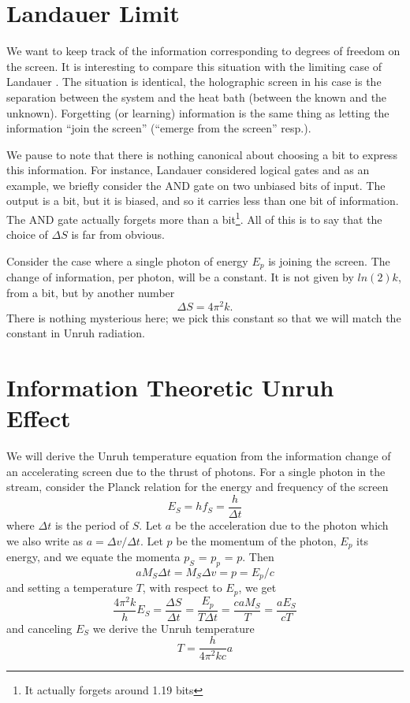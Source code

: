 \documentclass[12pt,a4paper]{article}
\begin{document}
\section{Landauer Limit}
We want to keep track of the information corresponding to degrees of freedom on the screen. It is interesting to compare this situation with the limiting case of Landauer \cite{landauer}.  The situation is identical, the holographic screen in his case is the separation between the system and the heat bath (between the known and the unknown).  Forgetting (or learning) information is the same thing as letting the information ``join the screen'' (``emerge from the screen'' resp.).

We pause to note that there is nothing canonical about choosing a bit to express this information.  For instance, Landauer considered logical gates and as an example, we briefly consider the AND gate on two unbiased bits of input.  The output is a bit, but it is biased, and so it carries less than one bit of information.  The AND gate actually forgets more than a bit\footnote{It actually forgets around 1.19 bits}.  All of this is to say that the choice of $\Delta S$ is far from obvious.

Consider the case where a single photon of energy $E_p$ is joining the screen.  The change of information, per photon, will be a constant.  It is not given by $ln(2)k$, from a bit, but by another number
\[
  \Delta S = 4 \pi ^ 2 k.
\]
There is nothing mysterious here; we pick this constant so that we will match the constant in Unruh radiation.

\section{Information Theoretic Unruh Effect}

We will derive the Unruh temperature equation from the information change of an accelerating screen due to the thrust of photons. For a single photon in the stream, consider the Planck relation for the energy and frequency of the screen
\[
  E_S = h f_S = \frac{h}{\Delta t}
\]
where $\Delta t$ is the period of $S$. Let $a$ be the acceleration due to the photon which we also write as $a = \Delta v / \Delta t$.  Let $p$ be the momentum of the photon, $E_p$ its energy, and we equate the momenta $p_S$ = $p_p$ = $p$.  Then
\[
  a M_S \Delta t = M_S  \Delta v = p = E_p / c
  \]
and setting a temperature $T$, with respect to $E_p$, we get
\[
  \frac{4 \pi^2 k}{h} E_S = \frac{\Delta S}{\Delta t} = \frac{E_p}{T \Delta t} = \frac{ca M_S}{T} = \frac{aE_S}{cT}
\]
and canceling $E_S$ we derive the Unruh temperature \cite{unruh}
\[
T = \frac{h}{4\pi^2k c} a
\]
\end{document}
